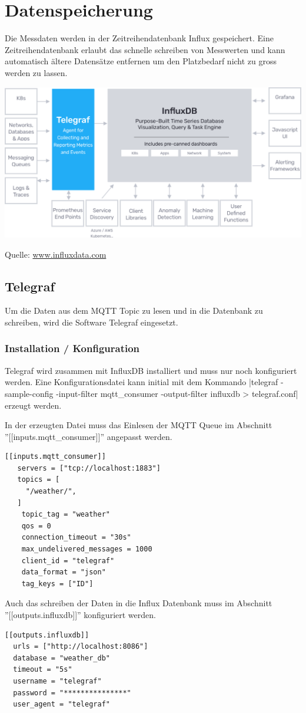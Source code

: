 \documentclass[
  12pt, %
  a4paper, %
  twoside, %
  openany, %
  numbers=noenddot, %
  BCOR=5mm, %
  parskip=half*, %
  thesis, %
]{bfhbook}
\newcommand{\source}[1]{\caption*{Quelle: {#1}} }
\begin{document}
\section{Datenspeicherung}
Die Messdaten werden in der Zeitreihendatenbank Influx \cite{influx} gespeichert. Eine Zeitreihendatenbank erlaubt das schnelle schreiben von Messwerten und kann automatisch ältere Datensätze entfernen um den Platzbedarf nicht zu gross werden zu lassen.
  \begin{center}
    \includegraphics[width=\textwidth, valign=t]{Bilder/InfluxDB-2.png}
    \captionsetup{justification=centering}
    \source{\url{www.influxdata.com}}
   \end{center}
   \subsection{Telegraf}
Um die Daten aus dem MQTT Topic zu lesen und in die Datenbank zu schreiben, wird die Software Telegraf \cite{telegraf} eingesetzt.
\subsubsection{Installation / Konfiguration}
Telegraf wird zusammen mit InfluxDB installiert und muss nur noch konfiguriert werden. Eine Konfigurationsdatei kann initial mit dem Kommando |telegraf -sample-config -input-filter mqtt_consumer -output-filter influxdb > telegraf.conf| erzeugt werden.

In der erzeugten Datei muss das Einlesen der MQTT Queue im Abschnitt ''[[inputs.mqtt{\_}consumer]]'' angepasst werden.
\begin{verbatim}
[[inputs.mqtt_consumer]]
   servers = ["tcp://localhost:1883"]
   topics = [
     "/weather/",
   ]
    topic_tag = "weather"
    qos = 0
    connection_timeout = "30s"
    max_undelivered_messages = 1000
    client_id = "telegraf"
    data_format = "json"
    tag_keys = ["ID"]
\end{verbatim}
Auch das schreiben der Daten in die Influx Datenbank muss im Abschnitt ''[[outputs.influxdb]]'' konfiguriert werden.
\begin{verbatim}
[[outputs.influxdb]]
  urls = ["http://localhost:8086"]
  database = "weather_db"
  timeout = "5s"
  username = "telegraf"
  password = "***************"
  user_agent = "telegraf"
\end{verbatim}
\end{document}
